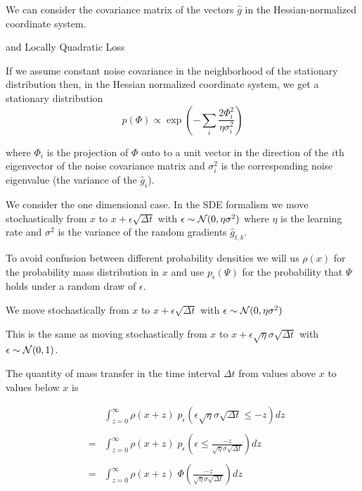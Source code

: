 {\vfill
We can consider the covariance matrix of the vectors $\hat{g}$ in the Hessian-normalized coordinate system.

{and Locally Quadratic Loss}

If we assume constant noise covariance in the neighborhood of the stationary distribution then, in the Hessian normalized
coordinate system, we get a stationary distribution
$$p(\Phi) \propto \exp\left(-\sum_i \frac{2{\Phi_i^2}}{\eta\sigma_i^2}\right)$$

\vfill
where $\Phi_i$ is the projection of $\Phi$ onto to a unit vector in the direction of the $i$th eigenvector of the noise covariance matrix and $\sigma^2_i$
is the corresponding noise eigenvalue (the variance of the $\hat{g}_i$).



{\Large
We consider the one dimensional case. In the SDE formalism we move stochastically from $x$ to $x + \epsilon \sqrt{\Delta t}$ with $\epsilon \sim {\cal N}(0,\eta\sigma^2)$
where $\eta$ is the learning rate and $\sigma^2$ is the variance of the random gradients $\hat{g}_{t,b}$.

\vfill
To avoid confusion between different probability densities we will us $\rho(x)$ for the probability mass distribution in $x$ and use $p_\epsilon(\Psi)$
for the probability that $\Psi$ holds under a random draw of $\epsilon$.

}

{\Large

We move stochastically from $x$ to $x + \epsilon \sqrt{\Delta t}$ with $\epsilon \sim {\cal N}(0,\eta\sigma^2)$

\vfill
This is the same as moving stochastically from $x$ to $x + \epsilon\sqrt{\eta}\sigma\sqrt{\Delta t}$ with $\epsilon \sim {\cal N}(0,1)$.

\vfill
The quantity of mass transfer in the time interval $\Delta t$ from values above $x$ to values below $x$ is


\begin{eqnarray*}
& & \int_{z = 0}^\infty  \rho(x + z)\;p_\epsilon(\epsilon\sqrt{\eta}\sigma\sqrt{\Delta t} \leq -z) dz  \\
\\
& = & \int_{z = 0}^\infty  \rho(x + z)\;p_\epsilon\left(\epsilon \leq \frac{-z}{\sqrt{\eta}\sigma\sqrt{\Delta t}}\right) dz  \\
\\
& =  & \int_{z = 0}^\infty \rho(x+z)\;\Phi\left(\frac{-z}{\sqrt{\eta}\sigma\sqrt{\Delta t}}\right) dz
\end{eqnarray*}

}}
